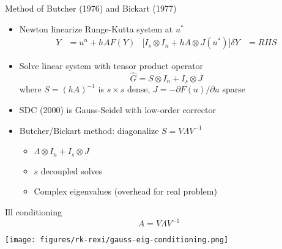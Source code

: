 \documentclass{beamer}
\begin{document}
\begin{frame}{Method of Butcher (1976) and Bickart (1977)}
  \begin{itemize}
  \item Newton linearize Runge-Kutta system at $u^*$
    \begin{align*}
      Y &= u^{n} + h A F(Y) & \big[ I_s \otimes I_n + h A \otimes J(u^*)\big ] \delta Y &= RHS
    \end{align*}
  \item Solve linear system with tensor product operator
    \begin{equation*}
      \hat G = S \otimes I_n + I_s \otimes J
    \end{equation*}
    where $S = (hA)^{-1}$ is $s\times s$ dense, $J = -\partial F(u)/\partial u$ sparse
  \item SDC (2000) is Gauss-Seidel with low-order corrector
  \item Butcher/Bickart method: diagonalize $S = V \Lambda V^{-1}$
    \begin{itemize}
    \item $\Lambda \otimes I_n + I_s \otimes J$
    \item $s$ decoupled solves
    \item Complex eigenvalues (overhead for real problem)
    \end{itemize}
  \end{itemize}
\end{frame}

\begin{frame}{Ill conditioning}
  \begin{equation*}
    A = V \Lambda V^{-1}
  \end{equation*}
  \begin{center}
    \texttt{[image: figures/rk-rexi/gauss-eig-conditioning.png]} \\
  \end{center}
\end{frame}
\end{document}
